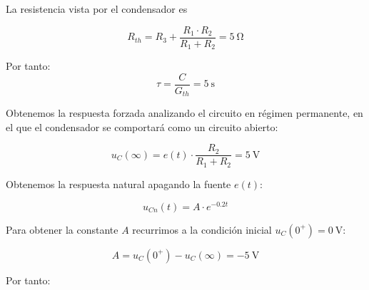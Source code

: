 \documentclass[12pt]{article}
\begin{document}
\begin{enumerate}
  \begin{minipage}{0.6\linewidth}
    La resistencia vista por el condensador es

  \[
    R_{th} = R_3 + \frac{R_1 \cdot R_2}{R_1 + R_2} = \qty{5}{\ohm}
  \]

  Por tanto:
  \begin{equation*}
    \tau = \frac{C}{G_{th}} = \qty{5}{\second}
  \end{equation*}
\end{minipage}
\begin{minipage}{0.4\linewidth}
\end{minipage}

Obtenemos la respuesta forzada analizando el circuito en régimen
permanente, en el que el condensador se comportará como un circuito
abierto:

\begin{equation*}
  u_{C}(\infty) = e(t) \cdot \frac{R_2}{R_1 + R_2} = \qty{5}{\volt}
\end{equation*}

Obtenemos la respuesta natural apagando la fuente $e(t)$:

\begin{equation*}
  u_{Cn}(t) = A \cdot e^{-0.2t}
\end{equation*}

Para obtener la constante $A$ recurrimos a la condición inicial
$u_C(0^+) = \qty{0}{\volt}$:

\begin{equation*}
  A = u_C(0^+) - u_C(\infty) = \qty{-5}{\volt}
\end{equation*}

Por tanto:


\end{enumerate}
\end{document}
